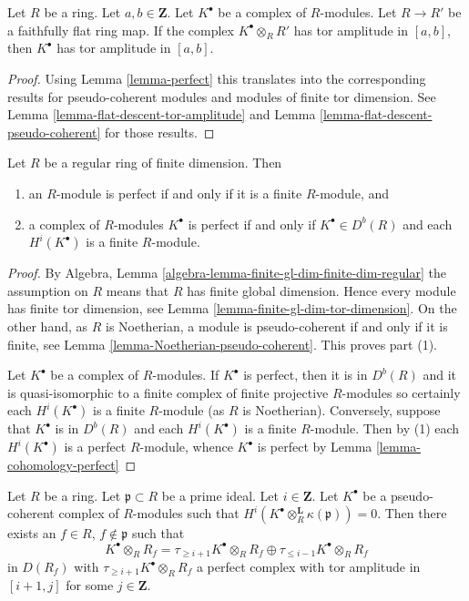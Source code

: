 \begin{lemma}
\label{lemma-flat-descent-perfect}
Let $R$ be a ring. Let $a, b \in \mathbf{Z}$. Let $K^\bullet$
be a complex of $R$-modules. Let $R \to R'$ be a faithfully flat
ring map. If the complex $K^\bullet \otimes_R R'$ has tor amplitude
in $[a, b]$, then $K^\bullet$ has tor amplitude in $[a, b]$.
\end{lemma}

\begin{proof}
Using
Lemma \ref{lemma-perfect}
this translates into the corresponding results for pseudo-coherent modules
and modules of finite tor dimension. See
Lemma \ref{lemma-flat-descent-tor-amplitude}
and
Lemma \ref{lemma-flat-descent-pseudo-coherent}
for those results.
\end{proof}

\begin{lemma}
\label{lemma-regular-perfect}
Let $R$ be a regular ring of finite dimension. Then
\begin{enumerate}
\item an $R$-module is perfect if and only if it is a finite $R$-module, and
\item a complex of $R$-modules $K^\bullet$ is perfect if and only
if $K^\bullet \in D^b(R)$ and each $H^i(K^\bullet)$ is a finite $R$-module.
\end{enumerate}
\end{lemma}

\begin{proof}
By
Algebra, Lemma \ref{algebra-lemma-finite-gl-dim-finite-dim-regular}
the assumption on $R$ means that $R$ has finite global dimension.
Hence every module has finite tor dimension, see
Lemma \ref{lemma-finite-gl-dim-tor-dimension}.
On the other hand, as $R$ is Noetherian, a module is pseudo-coherent
if and only if it is finite, see
Lemma \ref{lemma-Noetherian-pseudo-coherent}.
This proves part (1).

\medskip\noindent
Let $K^\bullet$ be a complex of $R$-modules.
If $K^\bullet$ is perfect, then it is in $D^b(R)$ and it is
quasi-isomorphic to a finite complex of finite projective $R$-modules
so certainly each $H^i(K^\bullet)$ is a finite $R$-module (as $R$ is
Noetherian). Conversely, suppose that $K^\bullet$ is in $D^b(R)$
and each $H^i(K^\bullet)$ is a finite $R$-module. Then by (1) each
$H^i(K^\bullet)$ is a perfect $R$-module, whence $K^\bullet$ is
perfect by
Lemma \ref{lemma-cohomology-perfect}
\end{proof}

\begin{lemma}
\label{lemma-cut-complex-in-two}
Let $R$ be a ring. Let $\mathfrak p \subset R$ be a prime ideal.
Let $i \in \mathbf{Z}$. Let $K^\bullet$ be a pseudo-coherent complex
of $R$-modules such that
$H^i(K^\bullet \otimes_R^{\mathbf{L}} \kappa(\mathfrak p)) = 0$.
Then there exists an $f \in R$, $f \not \in \mathfrak p$ such that
$$
K^\bullet \otimes_R R_f =
\tau_{\geq i + 1}K^\bullet \otimes_R R_f \oplus
\tau_{\leq i - 1}K^\bullet \otimes_R R_f
$$
in $D(R_f)$ with $\tau_{\geq i + 1}K^\bullet \otimes_R R_f$ a perfect
complex with tor amplitude in $[i + 1, j]$ for some $j \in \mathbf{Z}$.
\end{lemma}

